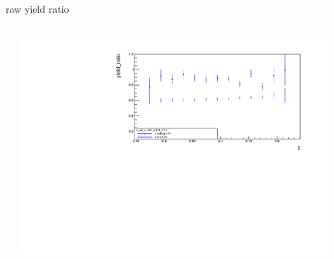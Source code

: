 \begin{frame}{raw yield ratio}
\begin{columns}
\begin{column}[T]{0.5\textwidth}
\end{column}
\begin{column}[T]{0.5\textwidth}
\includegraphics[width = 0.9\textwidth]{results/yield/statistics/x_Q2_z_0.50_3.979_0.70_ratio.pdf}
\end{column}
\end{columns}
\end{frame}
